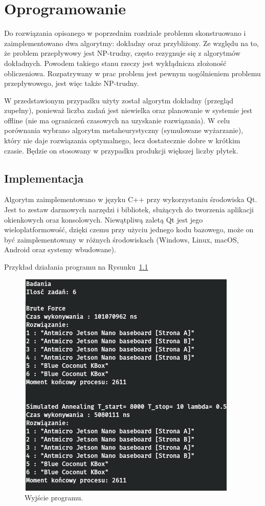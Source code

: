 \chapter{Oprogramowanie}

Do rozwiązania opisanego w poprzednim rozdziale problemu skonstruowano i zaimplementowano dwa algorytmy: dokładny oraz przybliżony.
Ze względu na to, że problem przepływowy jest NP-trudny, często rezygnuje się z algorytmów dokładnych. Powodem takiego stanu rzeczy jest wykłądnicza złożoność obliczeniowa. Rozpatrywany w prac problem jest pewnym uogólnieniem problemu przepływowego, jest więc także NP-trudny.

W przedstawionym przypadku użyty został algorytm dokładny (przegląd zupełny), ponieważ liczba zadań jest niewielka oraz planowanie w systemie jest offline (nie ma ograniczeń czasowych na uzyskanie rozwiązania).
W celu porównania wybrano algorytm metaheurystyczny (symulowane wyżarzanie), który nie daje rozwiązania optymalnego, lecz dostatecznie dobre w krótkim czasie. Będzie on stosowany w przypadku produkcji większej liczby płytek.

\section{Implementacja}
Algorytm zaimplementowano w języku C++ przy wykorzystaniu środowiska Qt. Jest to zestaw darmowych narzędzi i bibliotek, służących do tworzenia aplikacji okienkowych oraz konsolowych. Niewątpliwą zaletą Qt jest jego wieloplatformowość, dzięki czemu przy użyciu jednego kodu bazowego, może on być zaimplementowany w różnych środowiskach (Windows, Linux, macOS, Android oraz systemy wbudowane).

Przykład działania programu na Rysunku~\ref{app_out}

\begin{figure}[H]
	\centering
	\includegraphics[scale=0.6]{chapters/chapter4/app_out.png}
	\caption{Wyjście programu.}
	\label{app_out}
\end{figure}

